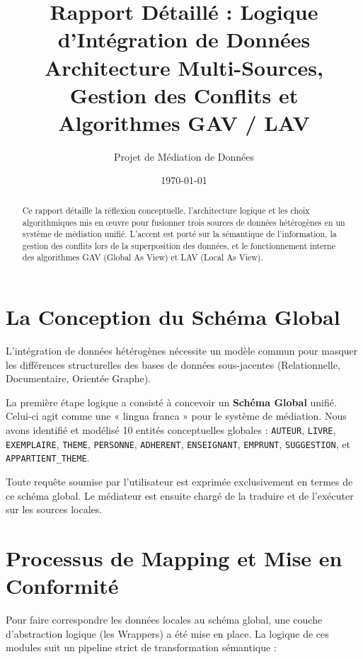 \documentclass[12pt,a4paper]{article}
\title{
  \textbf{Rapport Détaillé : Logique d'Intégration de Données}\\[0.5cm]
  \large Architecture Multi-Sources, Gestion des Conflits et Algorithmes GAV / LAV
}
\author{Projet de Médiation de Données}
\date{\today}
\begin{document}
\maketitle

\begin{abstract}
Ce rapport détaille la réflexion conceptuelle, l'architecture logique et les choix algorithmiques mis en œuvre pour fusionner trois sources de données hétérogènes en un système de médiation unifié. L'accent est porté sur la sémantique de l'information, la gestion des conflits lors de la superposition des données, et le fonctionnement interne des algorithmes GAV (Global As View) et LAV (Local As View).
\end{abstract}

\tableofcontents
\newpage

\section{La Conception du Schéma Global}

L'intégration de données hétérogènes nécessite un modèle commun pour masquer les différences structurelles des bases de données sous-jacentes (Relationnelle, Documentaire, Orientée Graphe). 

La première étape logique a consisté à concevoir un \textbf{Schéma Global} unifié. Celui-ci agit comme une « lingua franca » pour le système de médiation. Nous avons identifié et modélisé 10 entités conceptuelles globales : \texttt{AUTEUR}, \texttt{LIVRE}, \texttt{EXEMPLAIRE}, \texttt{THEME}, \texttt{PERSONNE}, \texttt{ADHERENT}, \texttt{ENSEIGNANT}, \texttt{EMPRUNT}, \texttt{SUGGESTION}, et \texttt{APPARTIENT\_THEME}.

Toute requête soumise par l'utilisateur est exprimée exclusivement en termes de ce schéma global. Le médiateur est ensuite chargé de la traduire et de l'exécuter sur les sources locales.

\section{Processus de Mapping et Mise en Conformité}

Pour faire correspondre les données locales au schéma global, une couche d'abstraction logique (les Wrappers) a été mise en place. La logique de ces modules suit un pipeline strict de transformation sémantique :
\end{document}

